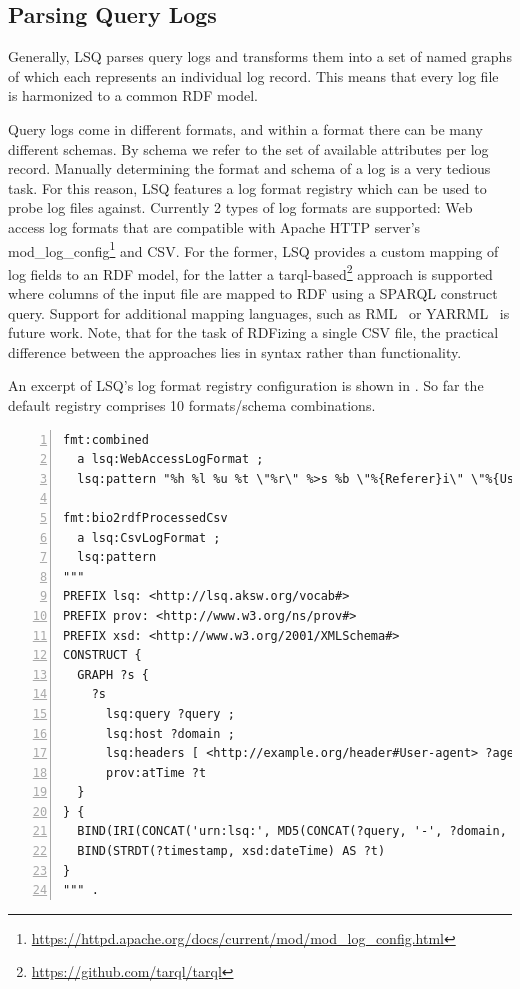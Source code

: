 \subsection{Parsing Query Logs}
Generally, LSQ parses query logs and transforms them into a set of named graphs of which each represents an individual log record. This means that every log file is harmonized to a common RDF model.

Query logs come in different formats, and within a format there can be many different schemas. By schema we refer to the set of available attributes per log record.
Manually determining the format and schema of a log is a very tedious task.
For this reason, LSQ features a log format registry which can be used to probe log files against.
Currently 2 types of log formats are supported: Web access log formats that are compatible with Apache HTTP server's mod\_log\_config\footnote{\url{https://httpd.apache.org/docs/current/mod/mod_log_config.html}}
and CSV. For the former, LSQ provides a custom mapping of log fields to an RDF model, for the latter a tarql-based\footnote{\url{https://github.com/tarql/tarql}} approach is supported where columns of the input file are mapped to RDF using a SPARQL construct query. Support for additional mapping languages, such as RML~\cite{dimou2014rml} or YARRML~\cite{Heyvaert2018Declarative} is future work. Note, that for the task of RDFizing a single CSV file, the practical difference between the approaches lies in syntax rather than functionality.

An excerpt of LSQ's log format registry configuration is shown in .
So far the default registry comprises 10 formats/schema combinations.


\begin{lstlisting}[label=lst:log-fmt-registry, caption=RDF-based log format registry used in LSQ, style=lst, language=ttl, float=*, numbers=left]
fmt:combined
  a lsq:WebAccessLogFormat ;
  lsq:pattern "%h %l %u %t \"%r\" %>s %b \"%{Referer}i\" \"%{User-agent}i\"" .

fmt:bio2rdfProcessedCsv
  a lsq:CsvLogFormat ;
  lsq:pattern
"""
PREFIX lsq: <http://lsq.aksw.org/vocab#>
PREFIX prov: <http://www.w3.org/ns/prov#>
PREFIX xsd: <http://www.w3.org/2001/XMLSchema#>
CONSTRUCT {
  GRAPH ?s {
    ?s
      lsq:query ?query ;
      lsq:host ?domain ;
      lsq:headers [ <http://example.org/header#User-agent> ?agent ] ;
      prov:atTime ?t
  }
} {
  BIND(IRI(CONCAT('urn:lsq:', MD5(CONCAT(?query, '-', ?domain, '-', ?timestamp)))) AS ?s)
  BIND(STRDT(?timestamp, xsd:dateTime) AS ?t)
}
""" .
\end{lstlisting}



